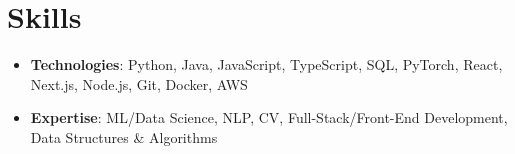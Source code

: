 \documentclass[letterpaper,11pt]{article}
\newcommand{\resumeItem}[1]{
  \item\small{
    {#1 \vspace{-2pt}}
  }
}
\newcommand{\resumeItemListStart}{\begin{itemize}}
\newcommand{\resumeItemListEnd}{\end{itemize}\vspace{-5pt}}
\begin{document}
%
\section{Skills}
    \resumeItemListStart
     \resumeItem{\small{\textbf{Technologies}: Python, Java, JavaScript, TypeScript, SQL, PyTorch, React, Next.js, Node.js, Git,  Docker, AWS}}
     \resumeItem{\small{\textbf{Expertise}: ML/Data Science, NLP, CV, Full-Stack/Front-End Development, Data Structures \& Algorithms}}
    \resumeItemListEnd
 


\end{document}
